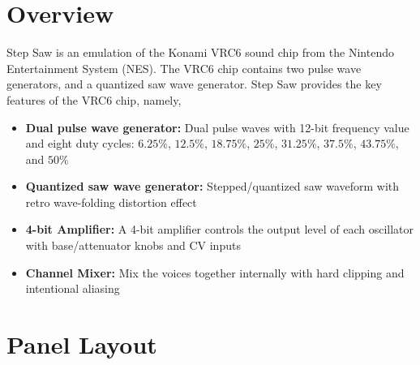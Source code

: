 \documentclass[12pt,letter]{article}
\begin{document}


\section*{Overview}

Step Saw is an emulation of the Konami VRC6 sound chip from the Nintendo Entertainment System (NES). The VRC6 chip contains two pulse wave generators, and a quantized saw wave generator. Step Saw provides the key features of the VRC6 chip, namely,
\begin{itemize}
  \item \textbf{Dual pulse wave generator:} Dual pulse waves with 12-bit frequency value and eight duty cycles: $6.25\%$, $12.5\%$, $18.75\%$, $25\%$, $31.25\%$, $37.5\%$, $43.75\%$, and $50\%$
  \item \textbf{Quantized saw wave generator:} Stepped/quantized saw waveform with retro wave-folding distortion effect
  \item \textbf{4-bit Amplifier:} A 4-bit amplifier controls the output level of each oscillator with base/attenuator knobs and CV inputs
  \item \textbf{Channel Mixer:} Mix the voices together internally with hard clipping and intentional aliasing
\end{itemize}


\clearpage
\section*{Panel Layout}
\end{document}
